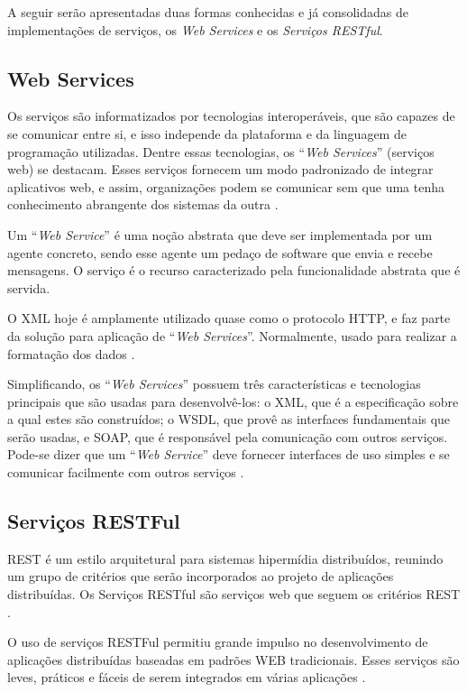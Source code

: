 \begin{apendicesenv}
A seguir serão apresentadas duas formas conhecidas e já consolidadas de implementações de serviços, os \textit{Web Services} e os \textit{Serviços RESTful}.

\subsection{Web Services}

Os serviços são informatizados por tecnologias interoperáveis, que são capazes de se comunicar entre si, e isso independe da plataforma e da linguagem de programação utilizadas. Dentre essas tecnologias, os ``\textit{Web Services}'' (serviços web) se destacam. Esses serviços fornecem um modo padronizado de integrar aplicativos web, e assim, organizações podem se comunicar sem que uma tenha conhecimento abrangente dos sistemas da outra \cite{Victorino:Brascher:2009}.

Um ``\textit{Web Service}'' é uma noção abstrata que deve ser implementada por um agente concreto, sendo esse agente um pedaço de software que envia e recebe mensagens. O serviço é o recurso caracterizado pela funcionalidade abstrata que é servida.

O XML hoje é amplamente utilizado quase como o protocolo HTTP, e faz parte da solução para aplicação de ``\textit{Web Services}''. Normalmente, usado para realizar a formatação dos dados \cite{Alonso:Casati:Kuno:Machiraju:2010}.

Simplificando, os ``\textit{Web Services}'' possuem três características e tecnologias principais que são usadas para desenvolvê-los: o XML, que é a especificação sobre a qual estes são construídos; o WSDL, que provê as interfaces fundamentais que serão usadas, e SOAP, que é responsável pela comunicação com outros serviços. Pode-se dizer que um ``\textit{Web Service}'' deve fornecer interfaces de uso simples e se comunicar facilmente com outros serviços \cite{Newcomer:Lomow:2004}.

\subsection{Serviços RESTFul}

REST é um estilo arquitetural para sistemas hipermídia distribuídos, reunindo um grupo de critérios que serão incorporados ao projeto de aplicações distribuídas. Os Serviços RESTful são serviços web que seguem os critérios REST \cite{Filho:2009}.

O uso de serviços RESTFul permitiu grande impulso no desenvolvimento de aplicações distribuídas baseadas em padrões WEB tradicionais. Esses serviços são leves, práticos e fáceis de serem integrados em várias aplicações \cite{Rosenberg:Curbera:Duftler:Khalaf:2008}.


\end{apendicesenv}
